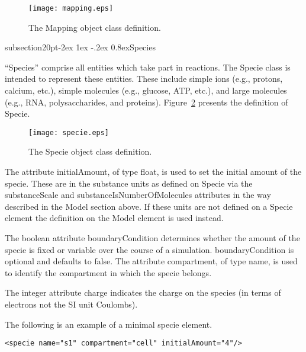 \documentclass[10pt]{article}
\makeatletter
\renewcommand{\subsection}{\@startsection%
  {subsection}{2}{0pt}{-2ex \@plus 1ex \@minus -.2ex}%
  {0.8ex}{\slshape\large\bfseries}}
\newcommand{\tightspacing}{\renewcommand{\baselinestretch}{0.85}}
\newcommand{\regularspacing}{\renewcommand{\baselinestretch}{1.0}}
\newcommand{\class}[1]{\textsf{#1}}
\newcommand{\attrib}[1]{\textsf{#1}}
\makeatother
\begin{document}
\begin{figure}[h]
  \centering
  \texttt{[image: mapping.eps]}
  \caption{The \class{Mapping} object class definition.}
  \label{fig:mapping}
\end{figure}


\subsection{Species}

``Species'' comprise all entities which take part in reactions.  The
\class{Specie} class is intended to represent these entities.  These
include simple ions (e.g., protons, calcium, etc.), simple molecules (e.g.,
glucose, ATP, etc.), and large molecules (e.g., RNA, polysaccharides, and
proteins).  Figure~\ref{fig:specie} presents the definition of
\class{Specie}.

\begin{figure}[h]
  \centering
  \texttt{[image: specie.eps]}
  \caption{The \class{Specie} object class definition.}
  \label{fig:specie}
\end{figure}

The attribute \attrib{initialAmount}, of type float, is used to
set the initial amount of the specie.  These are in the substance
units as defined on \class{Specie} via the
\attrib{substanceScale} and \attrib{substanceIsNumberOfMolecules}
attributes in the way described in the Model section above.  If
these units are not defined on a \class{Specie} element the
definition on the \class{Model} element is used instead.

The boolean attribute \attrib{boundaryCondition} determines
whether the amount of the specie is fixed or variable over the
course of a simulation. \attrib{boundaryCondition} is optional
and defaults to false. The attribute \attrib{compartment}, of
type name, is used to identify the compartment in which the
specie belongs.

The integer attribute \attrib{charge} indicates the charge on the
species (in terms of electrons not the SI unit Coulombs).

The following is an example of a minimal \class{specie} element.

\begin{small}
\tightspacing
\begin{verbatim}
<specie name="s1" compartment="cell" initialAmount="4"/>
\end{verbatim}
\regularspacing
\end{small}
\end{document}

